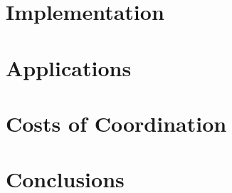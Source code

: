 \documentclass[pldi,blind,clearpagebib]{sigplanconf-pldi15}
\begin{document}
\section{Implementation}\label{sec:implementation}


\section{Applications}\label{sec:applications}


\section{Costs of Coordination}


\section{Conclusions}




\end{document}
